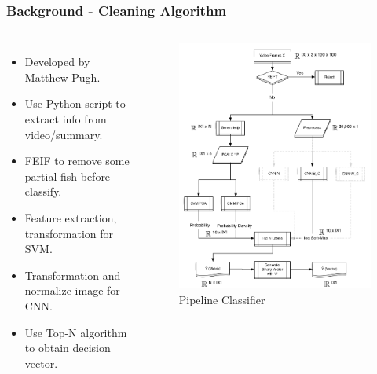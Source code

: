 \documentclass{beamer}[fullspacing]
\begin{document}
\begin{frame}
\frametitle{Background - Cleaning Algorithm}

\begin{columns}
\begin{itemize}
\item
Developed by Matthew Pugh\cite{Pugh}. 
\item
Use Python script to extract info from video/summary.
\item
FEIF to remove some partial-fish before classify.
\item
Feature extraction, transformation for SVM.
\item 
Transformation and normalize image for CNN.
\item
Use Top-N algorithm to obtain decision vector.
\end{itemize}

\begin{figure}
\includegraphics[scale=0.2]{image/pipe.png}
\caption{Pipeline Classifier}
\end{figure}
\end{columns}

\end{frame}
\end{document}
